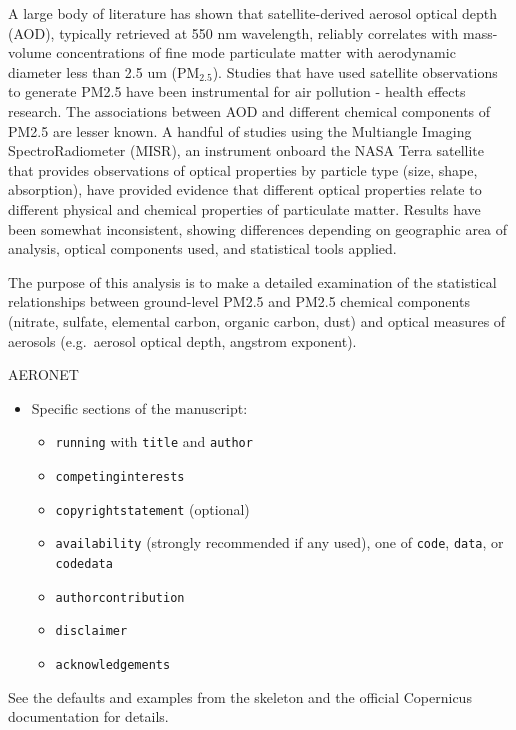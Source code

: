 \documentclass[, manuscript]{copernicus}
\begin{document}
A large body of literature has shown that satellite-derived aerosol
optical depth (AOD), typically retrieved at 550 nm wavelength, reliably
correlates with mass-volume concentrations of fine mode particulate
matter with aerodynamic diameter less than 2.5 um (PM\(_{2.5}\)).
Studies that have used satellite observations to generate PM2.5 have
been instrumental for air pollution - health effects research. The
associations between AOD and different chemical components of PM2.5 are
lesser known. A handful of studies using the Multiangle Imaging
SpectroRadiometer (MISR), an instrument onboard the NASA Terra satellite
that provides observations of optical properties by particle type (size,
shape, absorption), have provided evidence that different optical
properties relate to different physical and chemical properties of
particulate matter. Results have been somewhat inconsistent, showing
differences depending on geographic area of analysis, optical components
used, and statistical tools applied.

The purpose of this analysis is to make a detailed examination of the
statistical relationships between ground-level PM2.5 and PM2.5 chemical
components (nitrate, sulfate, elemental carbon, organic carbon, dust)
and optical measures of aerosols (e.g.~aerosol optical depth, angstrom
exponent).

AERONET \cite{Holben1998, Shin2018, Shin2019b, Shin2019}

\begin{itemize}
\item
  Specific sections of the manuscript:

  \begin{itemize}
  \item
    \texttt{running} with \texttt{title} and \texttt{author}
  \item
    \texttt{competinginterests}
  \item
    \texttt{copyrightstatement} (optional)
  \item
    \texttt{availability} (strongly recommended if any used), one of
    \texttt{code}, \texttt{data}, or \texttt{codedata}
  \item
    \texttt{authorcontribution}
  \item
    \texttt{disclaimer}
  \item
    \texttt{acknowledgements}
  \end{itemize}
\end{itemize}

See the defaults and examples from the skeleton and the official
Copernicus documentation for details.
\end{document}
